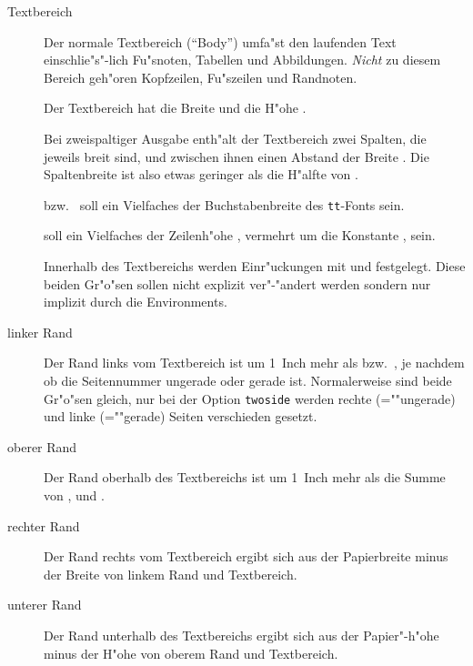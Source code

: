 \begin{description}

\item[Textbereich]
        Der normale Textbereich ("`Body"') umfa"st den laufenden 
        Text einschlie"s"-lich Fu"snoten, Tabellen und Abbildungen. 
        \emph{Nicht} zu diesem Bereich geh"oren Kopfzeilen, 
        Fu"szeilen und Randnoten.

        Der Textbereich hat die Breite  und die 
        H"ohe .

	Bei zweispaltiger Ausgabe enth"alt der Textbereich zwei Spalten, die
	jeweils  breit sind, und zwischen ihnen einen
	Abstand der Breite . Die Spaltenbreite
	 ist also etwas geringer als die H"alfte von
	.

         bzw.\  soll ein 
        Vielfaches der Buchstabenbreite des \texttt{tt}-Fonts sein.

         soll ein Vielfaches der 
        Zeilenh"ohe , vermehrt um die Konstante 
        , sein.

	Innerhalb des Textbereichs werden Einr"uckungen mit 
	und  festgelegt. Diese beiden Gr"o"sen sollen nicht
	explizit ver"-"andert werden sondern nur implizit durch die
	Environments.

\item[linker Rand]
        Der Rand links vom Textbereich ist um 1~Inch mehr als  bzw.\ , je nachdem ob die 
        Seitennummer ungerade oder gerade ist. Normalerweise sind beide 
        Gr"o"sen gleich, nur bei der Option \texttt{twoside} werden rechte 
        (=""ungerade) und linke (=""gerade) Seiten verschieden gesetzt.

\item[oberer Rand]
        Der Rand oberhalb des Textbereichs ist um 1~Inch mehr als die 
        Summe von ,  und 
        .

\item[rechter Rand]
        Der Rand rechts vom Textbereich ergibt sich aus der 
        Papierbreite minus der Breite von linkem Rand und Textbereich.

\item[unterer Rand]
        Der Rand unterhalb des Textbereichs ergibt sich aus der 
        Papier"-h"ohe minus der H"ohe von oberem Rand und Textbereich.


\end{description}
